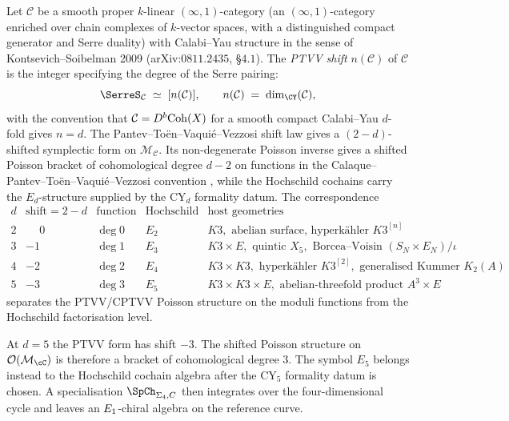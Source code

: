 \begin{definition}
\label{def:cy-c-beyond-ptvv-shift-datum}
Let $\mathcal{C}$ be a smooth proper
$k$-linear $(\infty, 1)$-category (an $(\infty,1)$-category enriched over
chain complexes of $k$-vector spaces, with a distinguished compact
generator and Serre duality)
with Calabi--Yau structure in the sense of
Kontsevich--Soibelman 2009
(arXiv:$0811.2435$, \S$4.1$). The \emph{PTVV shift} $n(\mathcal C)$ of $\mathcal C$ is the integer
specifying the degree of the Serre pairing:
\[
 \SerreS_{\mathcal C} \;\simeq\; [n(\mathcal C)],
 \qquad
 n(\mathcal C) \;=\; \dim_\CY(\mathcal C),
\]
with the convention that $\mathcal C = D^b\mathrm{Coh}(X)$ for a smooth compact
Calabi--Yau $d$-fold gives $n = d$. The Pantev--To\"en--Vaqui\'e--Vezzosi
shift law \cite[Theorem~2.5]{PTVV2013} gives a $(2-d)$-shifted
symplectic form on $\mathcal M_{\mathcal C}$. Its non-degenerate
Poisson inverse gives a shifted Poisson bracket of cohomological
degree \(d-2\) on functions in the
Calaque--Pantev--To\"en--Vaqui\'e--Vezzosi convention
\cite[Theorem~3.6]{CPTVV2017}, while the Hochschild cochains carry
the $E_d$-structure supplied by the CY$_d$ formality datum. The
correspondence
\[
\renewcommand{\arraystretch}{1.2}
\begin{array}{c|c|c|c|l}
 d & \mathrm{shift} = 2 - d & \text{function bracket} & \text{Hochschild} & \text{host geometries} \\\hline
 2 & \phantom{-}0 & \deg 0 & E_2 & K3, \text{ abelian surface, hyperk\"ahler } K3^{[n]} \\
 3 & -1 & \deg 1 & E_3 & K3 \times E, \text{ quintic } X_5, \text{ Borcea--Voisin } (S_N \times E_N)/\iota \\
 4 & -2 & \deg 2 & E_4 & K3 \times K3, \text{ hyperk\"ahler } K3^{[2]}, \text{ generalised Kummer } K_2(A) \\
 5 & -3 & \deg 3 & E_5 & K3 \times K3 \times E, \text{ abelian-threefold product } A^3 \times E
\end{array}
\]
separates the PTVV/CPTVV Poisson structure on the moduli functions
from the Hochschild factorisation level.
\end{definition}

\begin{remark}[The \texorpdfstring{$d=5$}{d=5} shifted-symplectic row]
\label{rem:cy-c-beyond-e5-poisson-from-shift}
At $d=5$ the PTVV form has shift $-3$. The shifted Poisson structure
on $\mathcal O(\mathcal M_{\cC})$ is therefore a bracket of
cohomological degree \(3\). The symbol $E_5$ belongs instead to
the Hochschild cochain algebra after the CY$_5$ formality datum is
chosen. A specialisation $\SpCh_{\Sigma_4,C}$ then integrates over the
four-dimensional cycle and leaves an $E_{1}$-chiral algebra on the
reference curve.
\end{remark}

